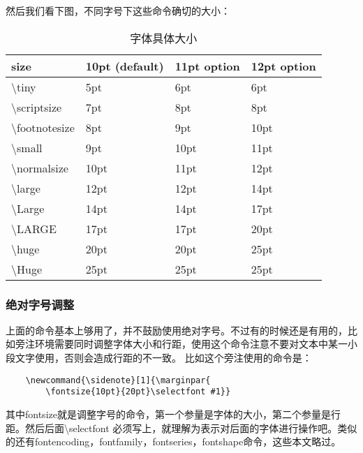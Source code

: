 \documentclass[11pt,oneside]{book}
\begin{document}
  然后我们看下图，不同字号下这些命令确切的大小：

  \begin{table}[H]
    \centering
    \begin{tabular}{@{}llll@{}}
      \toprule
      size          & 10pt (default) & 11pt option & 12pt option \\ \midrule
      \textbackslash tiny         & 5pt            & 6pt         & 6pt         \\
      \textbackslash scriptsize   & 7pt            & 8pt         & 8pt         \\
      \textbackslash footnotesize & 8pt            & 9pt         & 10pt        \\
      \textbackslash small        & 9pt            & 10pt        & 11pt        \\
      \textbackslash normalsize   & 10pt           & 11pt        & 12pt        \\
      \textbackslash large        & 12pt           & 12pt        & 14pt        \\
      \textbackslash Large        & 14pt           & 14pt        & 17pt        \\
      \textbackslash LARGE        & 17pt           & 17pt        & 20pt        \\
      \textbackslash huge         & 20pt           & 20pt        & 25pt        \\
      \textbackslash Huge         & 25pt           & 25pt        & 25pt        \\ \bottomrule
    \end{tabular}
    \label{tab:字体具体大小}
    \caption{字体具体大小}
  \end{table}


  \subsubsection{绝对字号调整}
  上面的命令基本上够用了，并不鼓励使用绝对字号。不过有的时候还是有用的，比如旁注环境需要同时调整字体大小和行距，使用这个命令注意不要对文本中某一小段文字使用，否则会造成行距的不一致。
  比如这个旁注使用的命令是：
  \begin{Verbatim}
    \newcommand{\sidenote}[1]{\marginpar{
        \fontsize{10pt}{20pt}\selectfont #1}}
  \end{Verbatim}
  其中fontsize就是调整字号的命令，第一个参量是字体的大小，第二个参量是行距。然后后面\textbackslash selectfont 必须写上，就理解为表示对后面的字体进行操作吧。类似的还有fontencoding，fontfamily，fontseries，fontshape命令，这些本文略过。
\end{document}
